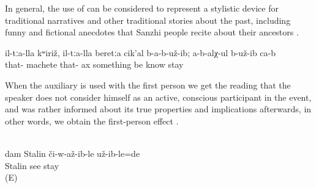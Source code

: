 In general, the use of  can be considered to represent a stylistic device for traditional narratives and other traditional stories about the past, including funny and fictional anecdotes that Sanzhi people recite about their ancestors .
%
\begin{exe}
	\ex	\label{ex:they had no machete nor ax, they did not know (these tools)}
	\gll	il-tːa-lla	kʷiriž,	il-tːa-lla	beretːa	cik'al	b-a-b-už-ib;	a-b-alχ-ul	b-už-ib	ca-b\\
		that-	machete	that-	ax	something	be	know	stay	\\
	\glt	{}
\end{exe}

When the auxiliary is used with the first person we get the reading that the speaker does not consider himself as an active, conscious participant in the event, and was rather informed about its true properties and implications afterwards, in other words, we obtain the first-person effect .
%
\begin{exe}
	\\\label{ex:(It turned out, that) I had seen Stalin@17}%
	\gll	dam	Stalin	či-w-až-ib-le	už-ib-le=de\\
			Stalin	see	stay\\
	\glt	{} (E)
\end{exe}
